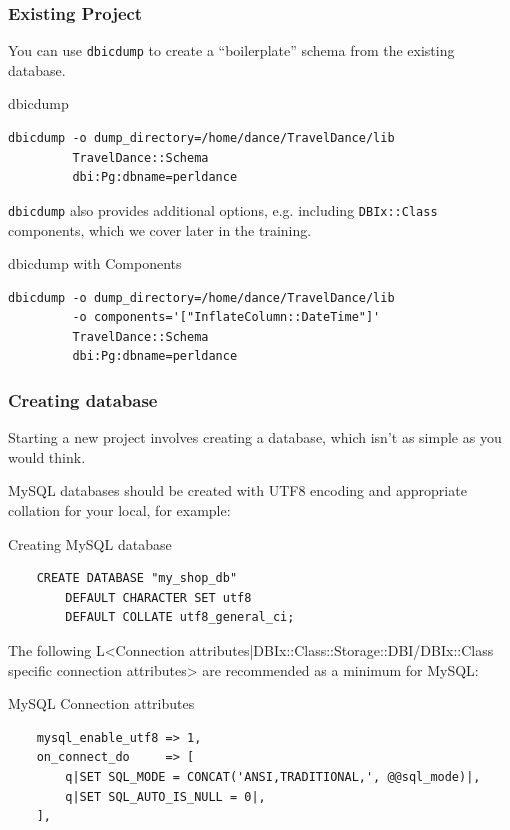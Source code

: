 \subsubsection{Existing Project}

You can use \verb|dbicdump| to create a ``boilerplate'' schema from the
existing database.

\begin{frame}[fragile]{dbicdump}
\begin{lstlisting}
dbicdump -o dump_directory=/home/dance/TravelDance/lib 
         TravelDance::Schema 
         dbi:Pg:dbname=perldance
\end{lstlisting}
\end{frame}

\verb|dbicdump| also provides additional options, e.g.
including \verb|DBIx::Class| components, which we cover
later in the training.

\begin{frame}[fragile]{dbicdump with Components}
\begin{lstlisting}
dbicdump -o dump_directory=/home/dance/TravelDance/lib 
         -o components='["InflateColumn::DateTime"]'
         TravelDance::Schema 
         dbi:Pg:dbname=perldance
\end{lstlisting}
\end{frame}

\subsubsection{Creating database}
Starting a new project involves creating a database, which
isn't as simple as you would think.

MySQL databases should be created with UTF8 encoding and appropriate 
collation for your local, for example:

\begin{frame}[fragile]{Creating MySQL database}
\begin{lstlisting}
    CREATE DATABASE "my_shop_db"
        DEFAULT CHARACTER SET utf8
        DEFAULT COLLATE utf8_general_ci;
\end{lstlisting}
\end{frame}

The following L<Connection attributes|DBIx::Class::Storage::DBI/DBIx::Class specific connection attributes> are recommended as a minimum for MySQL:

\begin{frame}[fragile]{MySQL Connection attributes}
\begin{lstlisting}
    mysql_enable_utf8 => 1,
    on_connect_do     => [
        q|SET SQL_MODE = CONCAT('ANSI,TRADITIONAL,', @@sql_mode)|,
        q|SET SQL_AUTO_IS_NULL = 0|,
    ],
\end{lstlisting}
\end{frame}

